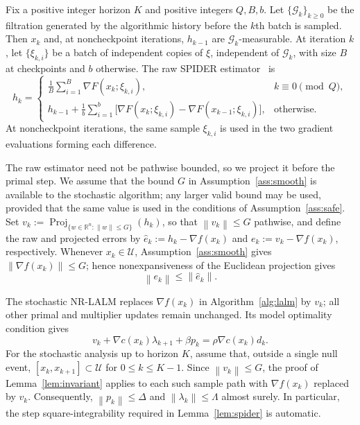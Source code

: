 \documentclass[11pt]{article}
\theoremstyle{definition}
\theoremstyle{remark}
\numberwithin{equation}{section}
\numberwithin{figure}{section}
\numberwithin{table}{section}
\numberwithin{algorithm}{section}
\newcommand{\R}{\mathbb{R}}
\newcommand{\norm}[1]{\left\lVert #1\right\rVert}
\newcommand{\grad}{\nabla}
\newcommand{\Proj}{\operatorname{Proj}}
\begin{document}
Fix a positive integer horizon \(K\) and positive integers \(Q,B,b\).  Let \(\{\mathcal G_k\}_{k\ge0}\) be the filtration generated by the algorithmic history before the \(k\)th batch is sampled.  Then \(x_k\) and, at noncheckpoint iterations, \(h_{k-1}\) are \(\mathcal G_k\)-measurable.  At iteration \(k\), let \(\{\xi_{k,i}\}\) be a batch of independent copies of \(\xi\), independent of \(\mathcal G_k\), with size \(B\) at checkpoints and
\(b\) otherwise.  The raw SPIDER estimator~\cite{FangEtAl2018} is
\begin{equation}
h_k=
\begin{cases}
\displaystyle \frac1B\sum_{i=1}^{B}\grad F(x_k;\xi_{k,i}),
    & k\equiv0\pmod Q,\\[2mm]
\displaystyle h_{k-1}+\frac1b\sum_{i=1}^{b}
\big[\grad F(x_k;\xi_{k,i})-\grad F(x_{k-1};\xi_{k,i})\big],
    & \text{otherwise}.
\end{cases}
\label{eq:spider}
\end{equation}
At noncheckpoint iterations, the same sample \(\xi_{k,i}\) is used in the two gradient evaluations forming each difference.

The raw estimator need not be pathwise bounded, so we project it before the primal step.  We assume that the bound \(G\) in Assumption~\ref{ass:smooth} is available to the stochastic algorithm; any larger valid bound may be used,
provided that the same value is used in the conditions of Assumption~\ref{ass:safe}. Set \(v_k:=\Proj_{\{w\in\R^n:\norm{w}\le G\}}(h_k)\), so that \(\norm{v_k}\le G\) pathwise, and define the raw and projected errors by \(\widehat e_k:=h_k-\grad f(x_k)\) and
\(e_k:=v_k-\grad f(x_k)\), respectively.  Whenever \(x_k\in\mathcal U\), Assumption~\ref{ass:smooth} gives \(\norm{\grad f(x_k)}\le G\); hence nonexpansiveness of the Euclidean projection gives
\begin{equation}
    \norm{e_k}\le \norm{\widehat e_k}.
    \label{eq:projectionerror}
\end{equation}

The stochastic NR-LALM replaces \(\grad f(x_k)\) in Algorithm~\ref{alg:lalm} by \(v_k\); all other primal and multiplier updates remain unchanged.  Its model optimality condition gives
\begin{equation}
    v_k+\grad c(x_k)\lambda_{k+1}+\beta p_k
    =\rho\grad c(x_k)d_k.
    \label{eq:stoch-identity}
\end{equation}
For the stochastic analysis up to horizon $K$, assume that, outside a single null event, $[x_k,x_{k+1}]\subset\mathcal U$ for $0\le k\le K-1$. Since \(\norm{v_k}\le G\),
the proof of Lemma~\ref{lem:invariant} applies to each such sample path with
\(\grad f(x_k)\) replaced by \(v_k\).  Consequently, $\norm{p_k}\le\Delta$ and $\norm{\lambda_k}\le\Lambda$ almost surely.  In particular, the step square-integrability required in
Lemma~\ref{lem:spider} is automatic.
\end{document}
